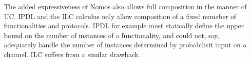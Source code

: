 The added expressiveness of Nomos also allows full composition in the manner of UC.
IPDL and the ILC calculus only allow composition of a fixed numeber of functionalities and protocols. 
IPDL for example must statically define the upper bound on the number of instances of a functionality, and could not, say, adequately handle the number of instances determined by probabilisit input on a channel.
ILC suffers from a similar drawback.

%
%
%


